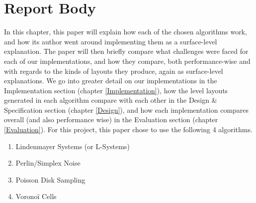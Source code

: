 \chapter{Report Body} \label{Body}

In this chapter, this paper will explain how each of the chosen algorithms work, and how its author went around implementing them as a surface-level explanation. The paper will then briefly compare what challenges were faced for each of our implementations, and how they compare, both performance-wise and with regards to the kinds of layouts they produce, again as surface-level explanations. We go into greater detail on our implementations in the Implementation section (chapter \ref{Implementation}), how the level layouts generated in each algorithm compare with each other in the Design \& Specification section (chapter \ref{Design}), and how each implementation compares overall (and also performance wise) in the Evaluation section (chapter \ref{Evaluation}). For this project, this paper chose to use the following 4 algorithms.

\begin{enumerate}
    \item Lindenmayer Systems (or L-Systems)
    \item Perlin/Simplex Noise
    \item Poisson Disk Sampling
    \item Voronoï Cells
\end{enumerate}

